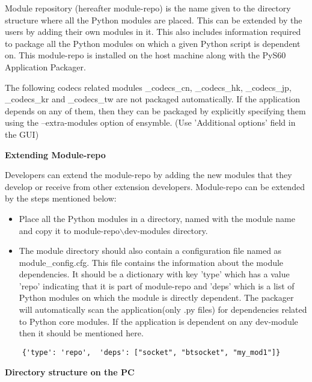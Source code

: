 Module repository (hereafter module-repo) is the name given to the directory
structure where all the Python modules are placed. This can be
extended by the users by adding their own modules in it. This also includes
information required to package all the Python modules on which a given Python
script is dependent on. This module-repo is installed on the host machine
along with the PyS60 Application Packager.

\begin{notice}[note]
The following codecs related modules _codecs_cn, _codecs_hk, _codecs_jp, _codecs_kr and
_codecs_tw are not packaged automatically. If the application depends on any of them, then
they can be packaged by explicitly specifying them using the --extra-modules option of
ensymble. (Use 'Additional options' field in the GUI)
\end{notice}

{\bf Extending Module-repo} \break

Developers can extend the module-repo by adding the new modules that they
develop or receive from other extension developers. Module-repo can be extended
by the steps mentioned below:

\begin {itemize}
\item Place all the Python modules in a directory, named with the module name
and copy it to module-repo$\backslash$dev-modules directory.

\item The module directory should also contain a configuration file named as
module_config.cfg. This file contains the information about the module
dependencies. It should be a dictionary with key 'type' which has a value 'repo'
indicating that it is part of module-repo and 'deps' which is a list
of Python modules on which the module is directly dependent. The packager will
automatically scan the application(only .py files) for dependencies related to
Python core modules. If the application is dependent on any dev-module then it
should be mentioned here.
\end {itemize}

\begin{verbatim}
    {'type': 'repo',  'deps': ["socket", "btsocket", "my_mod1"]}
\end{verbatim}


{\bf Directory structure on the PC} \break

